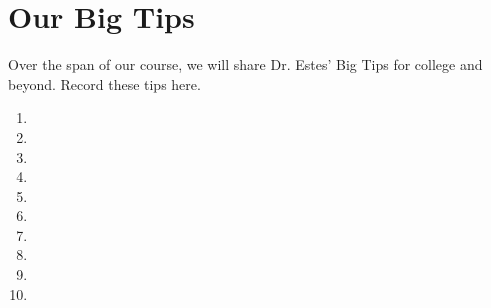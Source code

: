 
\section{Our Big Tips}

Over the span of our course, we will share Dr. Estes' Big Tips for college and beyond. Record these tips here.
{\huge
\begin{enumerate}
    \item 
    
    
    \item 
    
    \vspace{.5in}

    \item 
    
    \vspace{.5in}
    
    \item 
    
    \vspace{.5in}
        
    \item 
    
    \vspace{.5in}
    \item 

    \vspace{.5in}
    
    \item 

    \vspace{.5in}
    
    \item 

    \vspace{.5in}
    
    \item 

    \vspace{.5in}

    \item
    
    \vspace{.5in}
\end{enumerate}}